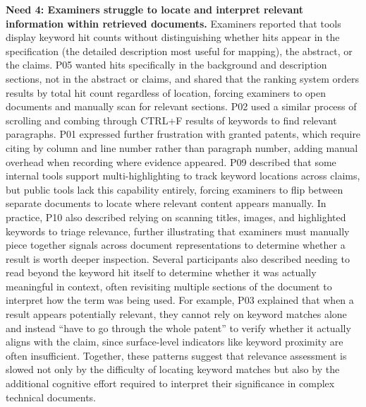 \documentclass[sigconf]{acmart}
\begin{document}
\smallskip\noindent\textbf{Need 4: Examiners struggle to locate and interpret
relevant information within retrieved documents.}
Examiners reported that tools display keyword hit counts without
distinguishing whether hits appear in the specification (the detailed
description most useful for mapping), the abstract, or the claims. P05 wanted
hits specifically in the background and description sections, not in the
abstract or claims, and shared that the ranking system orders results by total
hit count regardless of location, forcing examiners to open documents and
manually scan for relevant sections. P02 used a similar process of scrolling
and combing through CTRL+F results of keywords to find relevant paragraphs.
P01 expressed further frustration with granted patents, which require citing
by column and line number rather than paragraph number, adding manual overhead
when recording where evidence appeared. P09 described that some internal tools
support multi-highlighting to track keyword locations across claims, but
public tools lack this capability entirely, forcing examiners to flip between
separate documents to locate where relevant content appears manually. In
practice, P10 also described relying on scanning titles, images, and
highlighted keywords to triage relevance, further illustrating that examiners
must manually piece together signals across document representations to
determine whether a result is worth deeper inspection. Several participants
also described needing to read beyond the keyword hit itself to determine
whether it was actually meaningful in context, often revisiting multiple
sections of the document to interpret how the term was being used. For
example, P03 explained that when a result appears potentially relevant, they
cannot rely on keyword matches alone and instead ``have to go through the
whole patent'' to verify whether it actually aligns with the claim, since
surface-level indicators like keyword proximity are often insufficient.
Together, these patterns suggest that relevance assessment is slowed not only
by the difficulty of locating keyword matches but also by the additional
cognitive effort required to interpret their significance in complex technical
documents.
\end{document}
